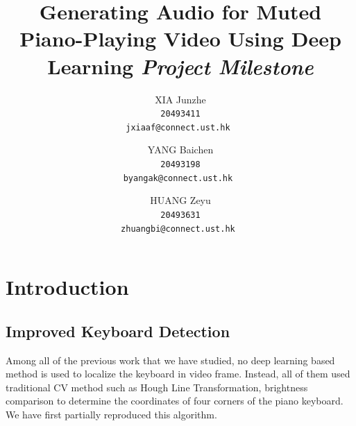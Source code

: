 \documentclass[10pt,twocolumn,letterpaper]{article}
\begin{document}
\title{Generating Audio for Muted Piano-Playing Video Using Deep Learning \newline \newline \textit{Project Milestone}}


\author{XIA Junzhe\\
\tt\small 20493411\\
{\tt\small jxiaaf@connect.ust.hk}
\and
YANG Baichen\\
\tt\small 20493198\\
{\tt\small byangak@connect.ust.hk}
\and
HUANG Zeyu\\
\tt\small 20493631\\
{\tt\small zhuangbi@connect.ust.hk}
}


\maketitle

\section{Introduction}

\subsection{Improved Keyboard Detection}

Among all of the previous work that we have studied, no deep learning based method is used to localize the keyboard in video frame. Instead, all of them used traditional CV method such as Hough Line Transformation, brightness comparison to determine the coordinates of four corners of the piano keyboard. We have first partially reproduced this algorithm.
\end{document}

